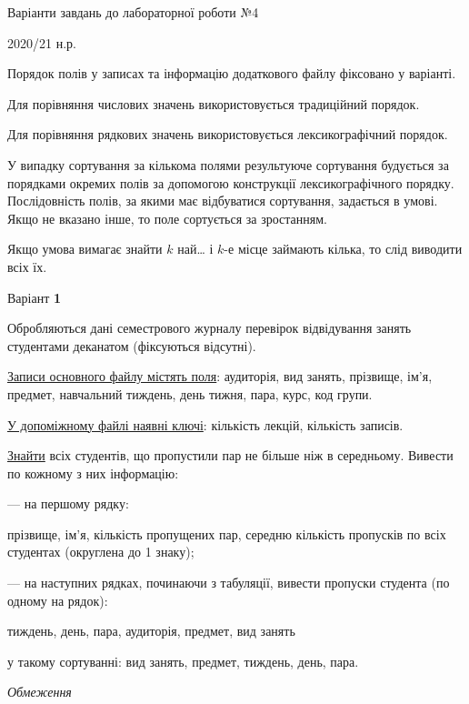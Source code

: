 \documentclass[11pt, ukrainian]{article}
\begin{document}
{\Large \center  Варіанти завдань до лабораторної роботи №4\par 2020/21 н.р.\par \bigskip\bigskip}

Порядок полів у записах та інформацію додаткового файлу фіксовано у варіанті.

Для порівняння числових значень використовується традиційний порядок.

Для порівняння рядкових значень використовується лексикографічний порядок. 

У випадку сортування за кількома полями результуюче сортування будується 
за порядками окремих полів за допомогою конструкції лексикографічного порядку. 
Послідовність полів, за якими має відбуватися сортування, задається в умові. 
Якщо не вказано інше, то поле сортується за зростанням.

Якщо умова вимагає знайти $k$ най… і $k$-е місце займають кілька, то слід виводити всіх їх.

\newpage
\par \bigskip

{\center Варіант  \No \textbf { 1 }\par}
\bigskip
Обробляються дані семестрового журналу перевірок відвідування занять студентами деканатом (фіксуються відсутні). 

\underline{Записи основного файлу містять поля}: аудиторія, вид занять, прізвище, ім’я, предмет, навчальний тиждень, день тижня, пара, курс, код групи.

\underline{У допоміжному файлі наявні ключі}: кількість лекцій, кількість записів.

\underline{Знайти} всіх студентів, що пропустили пар не більше ніж в середньому. Вивести по кожному з них інформацію:\par
{\noindent}--- на першому рядку:\par
прізвище, ім’я, кількість пропущених пар, середню кількість пропусків по всіх студентах (округлена до 1 знаку);

{\noindent}--- на наступних рядках, починаючи з табуляції, вивести пропуски студента (по одному на рядок):\par
тиждень, день, пара, аудиторія, предмет, вид занять

{\noindent}у такому сортуванні: вид занять, предмет, тиждень, день, пара.


\bigskip\textit{Обмеження}
\end{document}
